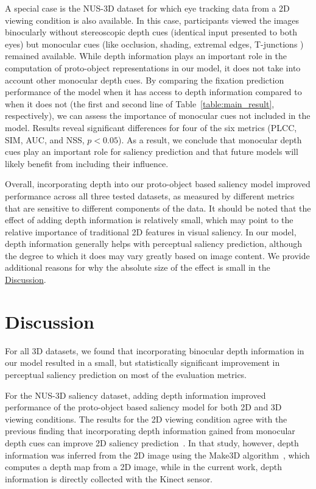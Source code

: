 A special case is the NUS-3D dataset for which eye tracking data from a 2D viewing condition is also available. In this case, participants viewed the images binocularly without stereoscopic depth cues (identical input presented to both eyes) but monocular cues (like occlusion, shading, extremal edges, T-junctions \etc) remained available. While depth information plays an important role in the computation of proto-object representations in our model, it does not take into account other monocular depth cues. By comparing the fixation prediction performance of the model when it has access to depth information compared to when it does not (the first and second line of Table~\ref{table:main_result}, respectively), we can assess the importance of monocular cues not included in the model. Results reveal significant differences for four of the six metrics (PLCC, SIM, AUC, and NSS, $p < 0.05$). As a result, we conclude that monocular depth cues play an important role for saliency prediction and that future models will likely benefit from including their influence.

Overall, incorporating depth into our proto-object based saliency model improved performance across all three tested datasets, as measured by different metrics that are sensitive to different components of the data. It should be noted that the effect of adding depth information is relatively small, which may point to the relative importance of traditional 2D features in visual saliency. In our model, depth information generally helps with perceptual saliency prediction, although the degree to which it does may vary greatly based on image content. We provide additional reasons for why the absolute size of the effect is small in the \hyperref[sec:discussion]{Discussion}. 

\section{Discussion}
\label{sec:discussion}
For all 3D datasets, we found that incorporating binocular depth information in our model resulted in a small, but statistically significant improvement in perceptual saliency prediction on most of the evaluation metrics.

For the NUS-3D saliency dataset, adding depth information improved performance of the proto-object based saliency model for both 2D and 3D viewing conditions. The results for the 2D viewing condition agree with the previous finding that incorporating depth information gained from monocular depth cues can improve 2D saliency prediction~\citep{Ramenahalli_etal13}. In that study, however, depth information was inferred from the 2D image using the Make3D algorithm~\citep{Saxena_etal09}, which computes a depth map from a 2D image, while in the current work, depth information is directly collected with the Kinect sensor.

